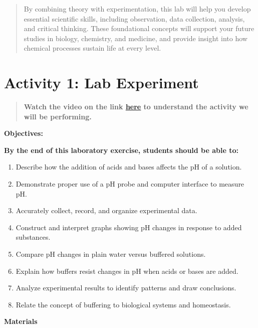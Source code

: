 \documentclass[
  letterpaper,
  DIV=11,
  numbers=noendperiod]{scrreprt}
\begin{document}
\begin{quote}
By combining theory with experimentation, this lab will help you develop
essential scientific skills, including observation, data collection,
analysis, and critical thinking. These foundational concepts will
support your future studies in biology, chemistry, and medicine, and
provide insight into how chemical processes sustain life at every level.
\end{quote}

\section{\texorpdfstring{\textbf{Activity 1: Lab
Experiment}}{Activity 1: Lab Experiment}}\label{activity-1-lab-experiment}

\begin{quote}
\textbf{Watch the video on the link
\href{https://www.youtube.com/watch?v=3oTbgE88PMI}{\ul{here}} to
understand the activity we will be performing.}
\end{quote}

\textbf{Objectives:}

\textbf{By the end of this laboratory exercise, students should be able
to:}

\begin{enumerate}
\def\labelenumi{\arabic{enumi}.}
\item
  Describe how the addition of acids and bases affects the pH of a
  solution.
\item
  Demonstrate proper use of a pH probe and computer interface to measure
  pH.
\item
  Accurately collect, record, and organize experimental data.
\item
  Construct and interpret graphs showing pH changes in response to added
  substances.
\item
  Compare pH changes in plain water versus buffered solutions.
\item
  Explain how buffers resist changes in pH when acids or bases are
  added.
\item
  Analyze experimental results to identify patterns and draw
  conclusions.
\item
  Relate the concept of buffering to biological systems and homeostasis.
\end{enumerate}

\textbf{Materials}
\end{document}
